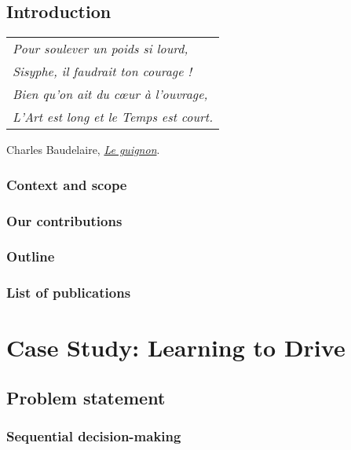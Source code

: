 \setcounter{mtc}{-1}
\adjustmtc


%

\chapter{Introduction}

\begin{flushright}
	\begin{tabular}{@{}l@{}}
		\emph{Pour soulever un poids si lourd,}\\
		\emph{Sisyphe, il faudrait ton courage !}\\
		\emph{Bien qu’on ait du cœur à l’ouvrage,}\\
		\emph{L’Art est long et le Temps est court.}\\
	\end{tabular}
	
	Charles Baudelaire, \href{https://eleurent.github.io/sisyphe/texts/le-guignon.html}{\emph{Le guignon}}.
\end{flushright}

\section{Context and scope}
\section{Our contributions}
\section{Outline}
\section{List of publications}
\part{Case Study: Learning to Drive}
\chapter{Problem statement}
\section{Sequential decision-making}
